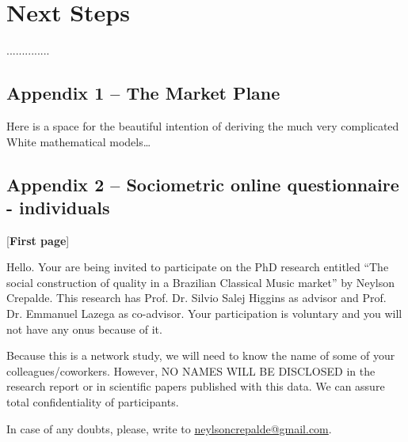 \documentclass[a4paper, 12pt, openright, oneside, german, french, brazil, english]{abntex2}
\begin{document}
        










        \chapter{Next Steps}

        ..............









        
	
	
\postextual
\anexos

	


	\newpage
	\section*{Appendix 1 -- The Market Plane}
	Here is a space for the beautiful intention of deriving the much very complicated White mathematical models\dots

        \newpage

        \section*{Appendix 2 -- Sociometric online questionnaire - individuals}

        [\textbf{First page}]
        
        Hello. Your are being invited to participate on the PhD research entitled ``The social construction of quality in a Brazilian Classical Music market'' by Neylson Crepalde. This research has Prof. Dr. Silvio Salej Higgins as advisor and Prof. Dr. Emmanuel Lazega as co-advisor. Your participation is voluntary and you will not have any onus because of it.

        Because this is a network study, we will need to know the name of some of your colleagues/coworkers. However, NO NAMES WILL BE DISCLOSED in the research report or in scientific papers published with this data. We can assure total confidentiality of participants.

        In case of any doubts, please, write to \url{neylsoncrepalde@gmail.com}.
\end{document}
